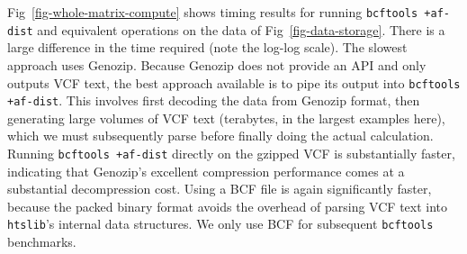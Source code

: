 \documentclass[a4paper,num-refs]{oup-contemporary}
\begin{document}
Fig~\ref{fig-whole-matrix-compute} shows timing results 
for running \texttt{bcftools +af-dist} and equivalent operations 
on the data of Fig~\ref{fig-data-storage}. There is a large
difference in the time required (note the log-log scale). 
The slowest approach uses Genozip. Because Genozip does not
provide an API and only outputs VCF text, the best approach available 
is to pipe its output into \texttt{bcftools +af-dist}. 
This involves first decoding the data from Genozip format,
then generating large volumes  of VCF text (terabytes, in the 
largest examples here), which we must 
subsequently parse before finally doing the actual calculation. 
Running \texttt{bcftools +af-dist} directly on the gzipped VCF
is substantially faster, indicating that Genozip's excellent
compression performance comes at a substantial decompression cost.
Using a BCF file is again significantly faster,
because the packed binary format avoids the overhead of parsing 
VCF text into \texttt{htslib}'s internal data structures. 
We only use BCF for subsequent \texttt{bcftools} benchmarks.
\end{document}
